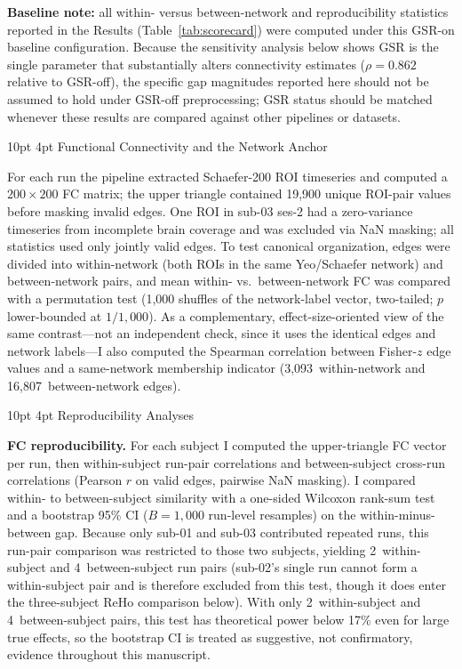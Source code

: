 \documentclass[12pt]{article}
\makeatletter
\renewcommand\subsection{%
  \@startsection{subsection}{2}{\z@}%
    {10pt \@plus 2pt \@minus 1pt}%
    {4pt}%
    {\normalfont\normalsize\bfseries}}
\makeatother
\begin{document}
\textbf{Baseline note:} all within- versus between-network and
reproducibility statistics reported in the Results
(Table~\ref{tab:scorecard}) were computed under this GSR-on baseline
configuration. Because the sensitivity analysis below shows GSR is the
single parameter that substantially alters connectivity estimates
($\rho = 0.862$ relative to GSR-off), the specific gap magnitudes
reported here should not be assumed to hold under GSR-off
preprocessing; GSR status should be matched whenever these results are
compared against other pipelines or datasets.

\subsection{Functional Connectivity and the Network Anchor}

For each run the pipeline extracted Schaefer-200 ROI timeseries and
computed a $200 \times 200$ FC matrix; the upper triangle contained
19,900 unique ROI-pair values before masking invalid edges. One ROI in
sub-03 ses-2 had a zero-variance timeseries from incomplete brain
coverage and was excluded via NaN masking; all statistics used only
jointly valid edges. To test canonical organization, edges were divided
into within-network (both ROIs in the same Yeo/Schaefer network) and
between-network pairs, and mean within- vs.\ between-network FC was
compared with a permutation test (1,000 shuffles of the network-label
vector, two-tailed; $p$ lower-bounded at $1/1{,}000$). As a
complementary, effect-size-oriented view of the same
contrast---not an independent check, since it uses the identical edges
and network labels---I also computed the Spearman correlation between
Fisher-$z$ edge values and a same-network membership indicator
(3,093~within-network and 16,807~between-network edges).

\subsection{Reproducibility Analyses}

\textbf{FC reproducibility.}
For each subject I computed the upper-triangle FC vector per run, then
within-subject run-pair correlations and between-subject cross-run
correlations (Pearson $r$ on valid edges, pairwise NaN masking). I
compared within- to between-subject similarity with a one-sided Wilcoxon
rank-sum test and a bootstrap 95\% CI ($B = 1{,}000$ run-level
resamples) on the within-minus-between gap. Because only sub-01 and
sub-03 contributed repeated runs, this run-pair comparison was restricted
to those two subjects, yielding 2~within-subject and 4~between-subject run
pairs (sub-02's single run cannot form a within-subject pair and is
therefore excluded from this test, though it does enter the three-subject
ReHo comparison below). With only 2~within-subject and 4~between-subject
pairs, this test has theoretical power below 17\% even for large true
effects, so the bootstrap CI is treated as suggestive, not confirmatory,
evidence throughout this manuscript.
\end{document}
